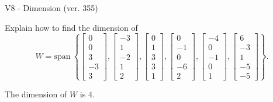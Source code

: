 \begin{exercise}
  \begin{exerciseTitle}V8 - Dimension (ver. 355)\end{exerciseTitle}
  \begin{exerciseStatement}
    Explain how to find the dimension of 
\[W=\mathrm{span}\ \left\{\left[\begin{array}{r}
0 \\
0 \\
3 \\
-3 \\
3
\end{array}\right] , \left[\begin{array}{r}
-3 \\
1 \\
-2 \\
1 \\
2
\end{array}\right] , \left[\begin{array}{r}
0 \\
1 \\
3 \\
3 \\
1
\end{array}\right] , \left[\begin{array}{r}
0 \\
-1 \\
0 \\
-6 \\
2
\end{array}\right] , \left[\begin{array}{r}
-4 \\
0 \\
-1 \\
0 \\
1
\end{array}\right] , \left[\begin{array}{r}
6 \\
-3 \\
1 \\
-5 \\
-5
\end{array}\right]\right\}.\]



  \end{exerciseStatement}
  \begin{exerciseAnswer}
   The dimension of \(W\) is  \(4\).
  


  \end{exerciseAnswer}
\end{exercise}